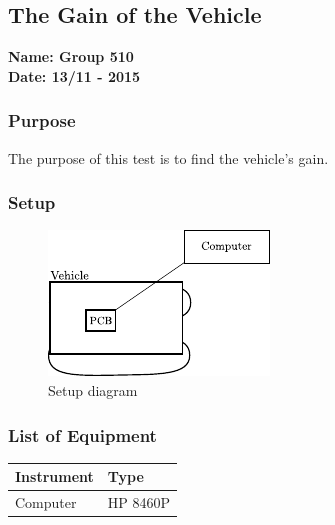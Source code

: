 \pagebreak
\subsection{The Gain of the Vehicle}\label{app:gainTest}
\textbf{Name: Group 510}\\
\textbf{Date: 13/11 - 2015}

\subsubsection{Purpose}
The purpose of this test is to find the vehicle's gain.

\subsubsection{Setup}

\begin{figure}[H]
	\centering
	\includegraphics[scale=1.6]{figures/inertiaTestSetupDiagram2.pdf}
	\caption{Setup diagram}
	\label{GainAndTimeTestSetupDiagram}
\end{figure}

\subsubsection{List of Equipment}

\begin{table}[H]
\begin{tabular}{|p{10cm}|p{4cm}|}
\hline%
  \textbf{Instrument}                     &  \textbf{Type}       \\
\hline%
  Computer                                &  HP 8460P    \\
\hline %
\end{tabular}
\end{table}

